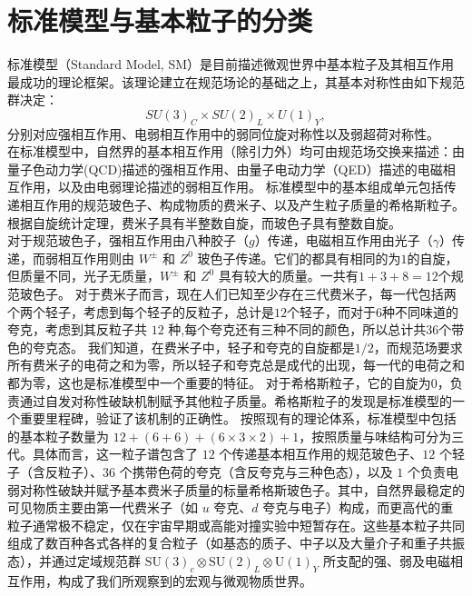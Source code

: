 \section{标准模型与基本粒子的分类}

标准模型（Standard Model, SM）是目前描述微观世界中基本粒子及其相互作用最成功的理论框架。该理论建立在规范场论的基础之上，其基本对称性由如下规范群决定：
\begin{equation}
SU(3)_C \times SU(2)_L \times U(1)_Y ,
\end{equation}
分别对应强相互作用、电弱相互作用中的弱同位旋对称性以及弱超荷对称性。\\

在标准模型中，自然界的基本相互作用（除引力外）均可由规范场交换来描述：由量子色动力学(QCD)描述的强相互作用、由量子电动力学（QED）描述的电磁相互作用，以及由电弱理论描述的弱相互作用。
标准模型中的基本组成单元包括传递相互作用的规范玻色子、构成物质的费米子、以及产生粒子质量的希格斯粒子。根据自旋统计定理，费米子具有半整数自旋，而玻色子具有整数自旋。\\

对于规范玻色子，强相互作用由八种胶子（$g$）传递，电磁相互作用由光子（$\gamma$）传递，而弱相互作用则由 $W^\pm$ 和 $Z^0$ 玻色子传递。它们的都具有相同的为$1$的自旋，但质量不同，光子无质量，$W^\pm$ 和 $Z^0$ 具有较大的质量。一共有$1+3+8=12$个规范玻色子。
对于费米子而言，现在人们已知至少存在三代费米子，每一代包括两个两个轻子，考虑到每个轻子的反粒子，总计是$12$个轻子，而对于$6$种不同味道的夸克，考虑到其反粒子共 $12$ 种,每个夸克还有三种不同的颜色，所以总计共$36$个带色的夸克态。
我们知道，在费米子中，轻子和夸克的自旋都是$1/2$，而规范场要求所有费米子的电荷之和为零，所以轻子和夸克总是成代的出现，每一代的电荷之和都为零，这也是标准模型中一个重要的特征。
对于希格斯粒子，它的自旋为$0$，负责通过自发对称性破缺机制赋予其他粒子质量。希格斯粒子的发现是标准模型的一个重要里程碑，验证了该机制的正确性。
按照现有的理论体系，标准模型中包括的基本粒子数量为 $12+(6+6)+(6\times3\times2)+ 1$，按照质量与味结构可分为三代。具体而言，这一粒子谱包含了 $12$ 个传递基本相互作用的规范玻色子、$12$ 个轻子（含反粒子）、$36$ 个携带色荷的夸克（含反夸克与三种色态），以及 $1$ 个负责电弱对称性破缺并赋予基本费米子质量的标量希格斯玻色子。其中，自然界最稳定的可见物质主要由第一代费米子（如 $u$ 夸克、$d$ 夸克与电子）构成，而更高代的重粒子通常极不稳定，仅在宇宙早期或高能对撞实验中短暂存在。这些基本粒子共同组成了数百种各式各样的复合粒子（如基态的质子、中子以及大量介子和重子共振态），并通过定域规范群 $\mathrm{SU}(3)_c \otimes \mathrm{SU}(2)_L \otimes \mathrm{U}(1)_Y$ 所支配的强、弱及电磁相互作用，构成了我们所观察到的宏观与微观物质世界。\\

